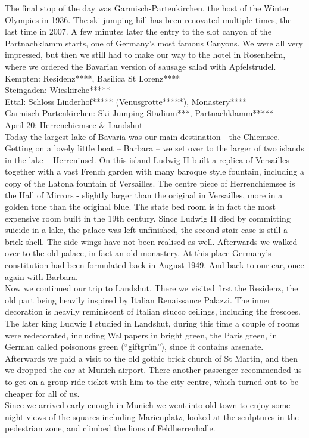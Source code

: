 The final stop of the day was Garmisch-Partenkirchen, the host of the Winter Olympics in 1936. The ski jumping hill has been renovated multiple times, the last time in 2007. A few minutes later the entry to the slot canyon of the Partnachklamm starts, one of Germany's most famous Canyons. We were all very impressed, but then we still had to make our way to the hotel in Rosenheim, where we ordered the Bavarian version of sausage salad with Apfelstrudel.\\

Kempten: Residenz****, Basilica St Lorenz****\\
Steingaden: Wieskirche*****\\
Ettal: Schloss Linderhof***** (Venusgrotte*****), Monastery****\\
Garmisch-Partenkirchen: Ski Jumping Stadium***, Partnachklamm*****\\

April 20: Herrenchiemsee \& Landshut\\
Today the largest lake of Bavaria was our main destination - the Chiemsee. Getting on a lovely little boat -- Barbara -- we set over to the larger of two islands in the lake -- Herreninsel. On this island Ludwig II built a replica of Versailles together with a vast French garden with many baroque style fountain, including a copy of the Latona fountain of Versailles. The centre piece of Herrenchiemsee is the Hall of Mirrors - slightly larger than the original in Versailles, more in a golden tone than the original blue. The state bed room is in fact the most expensive room built in the 19th century. Since Ludwig II died by committing suicide in a lake, the palace was left unfinished, the second stair case is still a brick shell. The side wings have not been realised as well. Afterwards we walked over to the old palace, in fact an old monastery. At this place Germany's constitution had been formulated back in August 1949. And back to our car, once again with Barbara.\\
Now we continued our trip to Landshut. There we visited first the Residenz, the old part being heavily inspired by Italian Renaissance Palazzi. The inner decoration is heavily reminiscent of Italian stucco ceilings, including the frescoes. The later king Ludwig I studied in Landshut, during this time a couple of rooms were redecorated, including Wallpapers in bright green, the Paris green, in German called poisonous green (``giftgr\"un''), since it contains arsenate. Afterwards we paid a visit to the old gothic brick church of St Martin, and then we dropped the car at Munich airport. There another passenger recommended us to get on a group ride ticket with him to the city centre, which turned out to be cheaper for all of us.\\
Since we arrived early enough in Munich we went into old town to enjoy some night views of the squares including Marienplatz, looked at the sculptures in the pedestrian zone, and climbed the lions of Feldherrenhalle.\\

